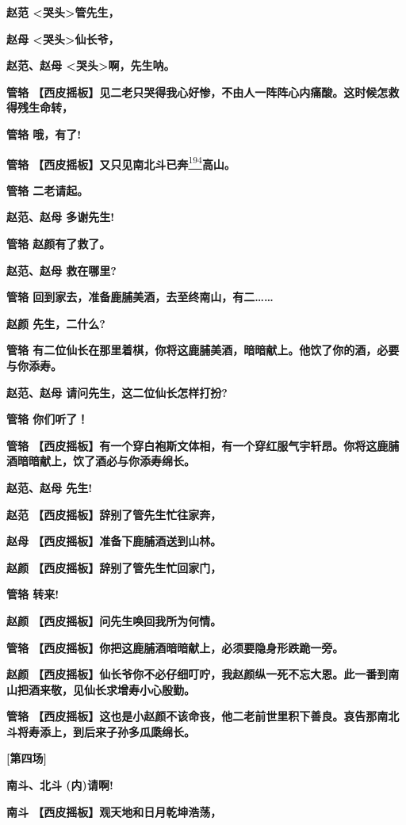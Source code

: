 \textbf{赵范 \textless{}哭头\textgreater{}管先生，}

\textbf{赵母 \textless{}哭头\textgreater{}仙长爷，}

\textbf{赵范、赵母 \textless{}哭头\textgreater{}啊，先生呐。}

\textbf{管辂
【西皮摇板】见二老只哭得我心好惨，不由人一阵阵心内痛酸。这时候怎救得残生命转，}

\textbf{管辂 哦，有了!}

\textbf{管辂
【西皮摇板】又只见南北斗已奔}\protect\hyperlink{fn194}{\textsuperscript{194}}\textbf{高山。}

\textbf{管辂 二老请起。}

\textbf{赵范、赵母 多谢先生!}

\textbf{管辂 赵颜有了救了。}

\textbf{赵范、赵母 救在哪里?}

\textbf{管辂 回到家去，准备鹿脯美酒，去至终南山，有二\ldots{}\ldots{}}

\textbf{赵颜 先生，二什么?}

\textbf{管辂
有二位仙长在那里着棋，你将这鹿脯美酒，暗暗献上。他饮了你的酒，必要与你添寿。}

\textbf{赵范、赵母 请问先生，这二位仙长怎样打扮?}

\textbf{管辂 你们听了！}

\textbf{管辂
【西皮摇板】有一个穿白袍斯文体相，有一个穿红服气宇轩昂。你将这鹿脯酒暗暗献上，饮了酒必与你添寿绵长。}

\textbf{赵范、赵母 先生!}

\textbf{赵范 【西皮摇板】辞别了管先生忙往家奔，}

\textbf{赵母 【西皮摇板】准备下鹿脯酒送到山林。}

\textbf{赵颜 【西皮摇板】辞别了管先生忙回家门，}

\textbf{管辂 转来!}

\textbf{赵颜 【西皮摇板】问先生唤回我所为何情。}

\textbf{管辂 【西皮摇板】你把这鹿脯酒暗暗献上，必须要隐身形跌跪一旁。}

\textbf{赵颜
【西皮摇板】仙长爷你不必仔细叮咛，我赵颜纵一死不忘大恩。此一番到南山把酒来敬，见仙长求增寿小心殷勤。}

\textbf{管辂
【西皮摇板】这也是小赵颜不该命丧，他二老前世里积下善良。哀告那南北斗将寿添上，到后来子孙多瓜瓞绵长。}

\textbf{{[}第四场{]}}

\textbf{南斗、北斗 (内)请啊!}

\textbf{南斗 【西皮摇板】观天地和日月乾坤浩荡，}

